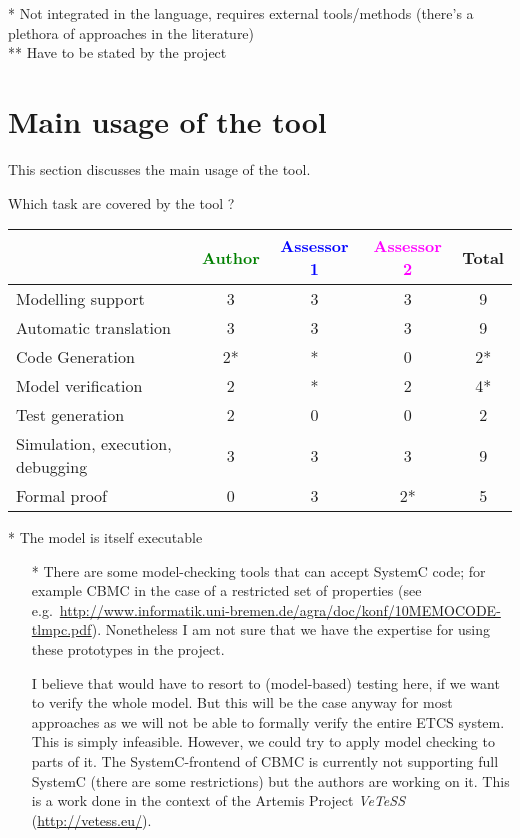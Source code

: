 \begin{author_comment}
 * Not integrated in the language, requires external tools/methods (there's a plethora of approaches in the literature)\\
 ** Have to be stated by the project
\end{author_comment}

\section{Main usage of the tool}
\label{main_usage}

This section discusses the main usage of the tool.

Which task are covered by the tool ?


\begin{tabular}{|l | c | c | c | c|}
\hline
& \textcolor{green}{Author} & \textcolor{blue}{Assessor 1} & \textcolor{magenta}{Assessor 2} & Total \\
\hline
Modelling support &3 &3 &3 & 9 \\
\hline
Automatic translation &3 &3 &3 & 9 \\
\hline
Code Generation &2* & * &0 & 2* \\
\hline
Model verification &2 & * &2 & 4* \\
\hline
Test generation &2 &0 &0 & 2 \\
\hline
Simulation, execution, debugging &3 &3 &3 & 9 \\
\hline
Formal proof &0 &3 &2* &  5\\
\hline
\end{tabular}

\begin{author_comment}
 * The model is itself executable
\end{author_comment}



\begin{assessor2}
  \begin{itemize}
  \item[*] There are some model-checking tools that can accept SystemC
    code; for example CBMC in the case of a restricted set of
    properties (see
    e.g.~\url{http://www.informatik.uni-bremen.de/agra/doc/konf/10MEMOCODE-tlmpc.pdf}). Nonetheless
    I am not sure that we have the expertise for using these
    prototypes in the project.
\begin{author_comment}
I believe that would have to resort to (model-based) testing here, if we want to verify the whole model. But this will be the case anyway for most approaches as we will not be able to formally verify the entire ETCS system. This is simply infeasible. However, we could try to apply model checking to parts of it. The SystemC-frontend of CBMC is currently not supporting full SystemC (there are some restrictions) but the authors are working on it. This is a work done in the context of the Artemis Project \emph{VeTeSS} (\url{http://vetess.eu/}).
\end{author_comment}
  \end{itemize}  
\end{assessor2}





